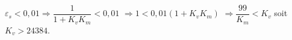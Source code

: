 \ifprof
\begin{corrige}
$\varepsilon_s < 0,01 \Rightarrow  \dfrac{1}{1+K_vK_m} < 0,01$
$\Rightarrow  1 < 0,01(1+K_vK_m)$
$\Rightarrow  \dfrac{99}{K_m}< K_v$ soit $K_v > 24384$.
\end{corrige}
\else
\fi






